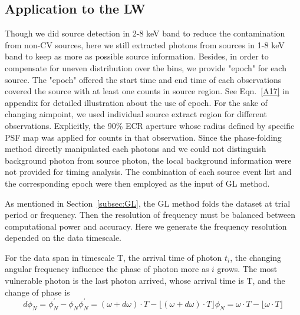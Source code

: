 \documentclass[fleqn,usenatbib]{mnras}
\begin{document}
\subsection{Application to the LW}\label{subsec:appli}
Though we did source detection in 2-8 keV band to reduce the contamination from non-CV sources, here we still extracted photons from sources in 1-8 keV band to keep as more as possible source information. 
Besides, in order to compensate for uneven distribution over the bins, we provide "epoch" for each source. The "epoch" offered the start time and end time of each observations covered the source with at least one counts in source region. See Eqn.~\ref{A17} in appendix for detailed illustration about the use of epoch. 
For the sake of changing aimpoint, we used individual source extract region for different observations. Explicitly, the 90\% ECR aperture  whose radius defined by specific PSF map was applied for counts in that observation. Since the phase-folding method directly manipulated each photons and we could not distinguish background photon from source photon, the local background information were not provided for timing analysis. The combination of each source event list and the corresponding epoch were then employed as the input of GL method. 

As mentioned in Section~\ref{subsec:GL}, the GL method folds the dataset at trial period or frequency. Then the resolution of frequency must be balanced between computational power and  accuracy. Here we generate the frequency resolution depended on the data timescale.

For the data span in timescale T, the arrival time of photon $t_i$, the changing angular frequency influence the phase of photon more as $i$ grows. The most vulnerable photon is the last photon arrived, whose arrival time is T, and the change of phase is
\begin{subequations}\label{fi}
\begin{equation}
	d\phi_{N}=\phi_{N}^{'}-\phi_{N}
\end{equation}
\begin{equation}
	\phi_{N}^{'}=(\omega +d\omega) \cdot T-\lfloor (\omega +d\omega) \cdot T \rfloor
\end{equation}
\begin{equation}
	\phi_{N}=\omega \cdot T-\lfloor \omega \cdot T \rfloor
\end{equation}
\end{subequations}
\\
\end{document}
